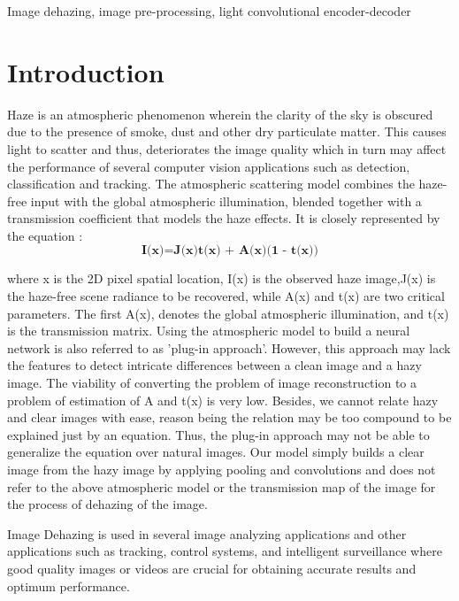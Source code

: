 \documentclass[conference]{IEEEtran}
\begin{document}
\begin{IEEEkeywords}

Image dehazing, image pre-processing, light convolutional encoder-decoder
\end{IEEEkeywords}

\section{Introduction}
Haze is an atmospheric phenomenon wherein the clarity of the sky is  obscured due to the presence of smoke, dust and other dry particulate matter. This causes light to scatter and thus, deteriorates the image quality which in turn may affect the performance of several computer vision applications such as detection, classification and tracking.
The atmospheric scattering model combines the haze-free
input with the global atmospheric illumination, blended together with a transmission coefficient that models the haze
effects. It is closely represented by the equation \cite{narasimhan2002vision}:
\begin{equation}
\textbf{I(x)=J(x)t(x) + A(x)(1 - t(x))}
\end{equation}

where x is the 2D pixel spatial location, I(x) is the observed
haze image,J(x) is the haze-free scene radiance to be recovered, while A(x) and t(x) are two critical parameters.
The first A(x), denotes the global atmospheric illumination, and t(x) is the transmission matrix.
\newline
Using the atmospheric model to build a neural network is also referred to as 'plug-in approach'. However, this approach may lack the features to detect intricate differences between a clean image and a hazy image. The viability of converting the problem of image reconstruction to a problem of estimation of A and t(x) is very low. Besides, we cannot relate hazy and clear images with ease, reason being the relation may be too compound to be explained just by an equation. Thus, the plug-in approach may not be able to generalize the equation over natural images.
Our model simply builds a clear image from the hazy image by applying pooling and convolutions and does not refer to the above atmospheric model or the transmission map of the image for the process of dehazing of the image.


Image Dehazing is used in several image analyzing applications and other applications such as tracking, control systems, and intelligent surveillance where good quality images or videos are crucial for obtaining accurate results and optimum performance.
\end{document}
